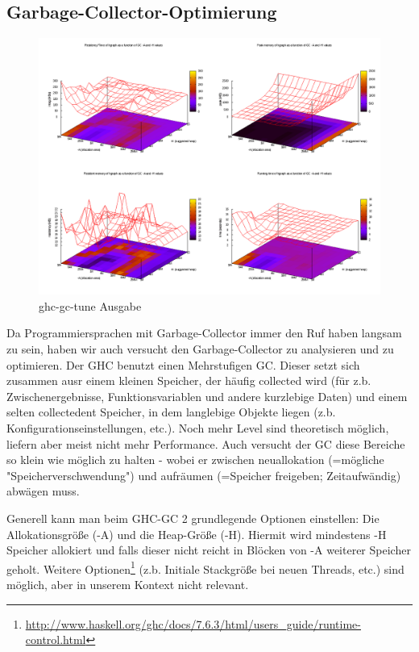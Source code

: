 \documentclass[a4paper]{scrartcl}
\begin{document}
\subsection{Garbage-Collector-Optimierung}
\begin{figure}[h!]
 \centering
 \includegraphics[width=15cm]{./img/gc_total.png}
 \caption{ghc-gc-tune Ausgabe}
 \label{fig:ghctune}
\end{figure}
Da Programmiersprachen mit Garbage-Collector immer den Ruf haben langsam zu sein, haben wir auch versucht den Garbage-Collector zu analysieren und zu optimieren. Der GHC benutzt einen Mehrstufigen GC. Dieser setzt sich zusammen ausr einem kleinen Speicher, der häufig collected wird (für z.b. Zwischenergebnisse, Funktionsvariablen und andere kurzlebige Daten) und einem selten collectedent Speicher, in dem langlebige Objekte liegen (z.b. Konfigurationseinstellungen, etc.). Noch mehr Level sind theoretisch möglich, liefern aber meist nicht mehr Performance. Auch versucht der GC diese Bereiche so klein wie möglich zu halten - wobei er zwischen neuallokation (=mögliche "Speicherverschwendung") und aufräumen (=Speicher freigeben; Zeitaufwändig) abwägen muss.\par \medskip
Generell kann man beim GHC-GC 2 grundlegende Optionen einstellen: Die Allokationsgröße (-A) und die Heap-Größe (-H). Hiermit wird mindestens -H Speicher allokiert und falls dieser nicht reicht in Blöcken von -A weiterer Speicher geholt. Weitere Optionen\footnote{\url{http://www.haskell.org/ghc/docs/7.6.3/html/users_guide/runtime-control.html}} (z.b. Initiale Stackgröße bei neuen Threads, etc.) sind möglich, aber in unserem Kontext nicht relevant.
\end{document}
